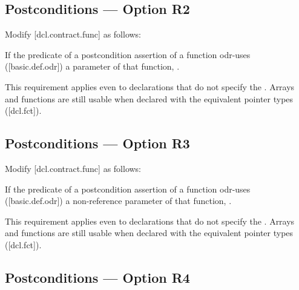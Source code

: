 \subsection*{Postconditions --- Option R2}

Modify [dcl.contract.func] as follows:

\begin{adjustwidth}{0.5cm}{0.5cm}
If the predicate of a postcondition assertion of a function odr-uses ([basic.def.odr]) a
parameter of that function, .
\begin{note}
This requirement applies even to declarations
that do not specify the . Arrays and functions are still usable when declared with the equivalent pointer types ([dcl.fct]).
\end{note}
\begin{example}
\tcode{[...]}
\end{example}
\end{adjustwidth}

\subsection*{Postconditions --- Option R3}

Modify [dcl.contract.func] as follows:

\begin{adjustwidth}{0.5cm}{0.5cm}
If the predicate of a postcondition assertion of a function odr-uses ([basic.def.odr]) a
non-reference parameter of that function, .
\begin{note}
This requirement applies even to declarations
that do not specify the . Arrays and functions are still usable when declared with the equivalent pointer types ([dcl.fct]).
\end{note}
\begin{example}
\tcode{[...]}
\end{example}
\end{adjustwidth}

\subsection*{Postconditions --- Option R4}

